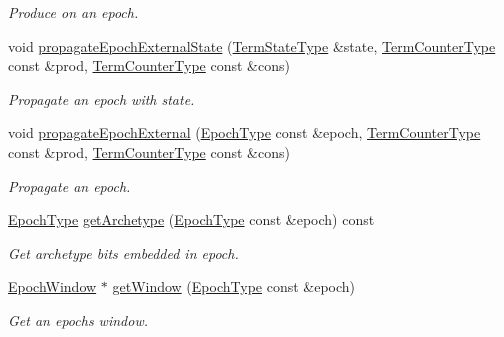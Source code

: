\begin{DoxyCompactItemize}
\begin{DoxyCompactList}\small\item\em Produce on an epoch. \end{DoxyCompactList}\item 
void \hyperlink{structvt_1_1term_1_1_termination_detector_a233dc0ec4468f6e8006c959d613c28fd}{propagate\+Epoch\+External\+State} (\hyperlink{structvt_1_1term_1_1_term_action_ae4c635b69751d887666814700ed64d65}{Term\+State\+Type} \&state, \hyperlink{namespacevt_1_1term_a4fd378cdb0c36683afc1b3399d685f7f}{Term\+Counter\+Type} const \&prod, \hyperlink{namespacevt_1_1term_a4fd378cdb0c36683afc1b3399d685f7f}{Term\+Counter\+Type} const \&cons)
\begin{DoxyCompactList}\small\item\em Propagate an epoch with state. \end{DoxyCompactList}\item 
void \hyperlink{structvt_1_1term_1_1_termination_detector_a580b7ba3727a7358125cf217e9dcab19}{propagate\+Epoch\+External} (\hyperlink{namespacevt_a985a5adf291c34a3ca263b3378388236}{Epoch\+Type} const \&epoch, \hyperlink{namespacevt_1_1term_a4fd378cdb0c36683afc1b3399d685f7f}{Term\+Counter\+Type} const \&prod, \hyperlink{namespacevt_1_1term_a4fd378cdb0c36683afc1b3399d685f7f}{Term\+Counter\+Type} const \&cons)
\begin{DoxyCompactList}\small\item\em Propagate an epoch. \end{DoxyCompactList}\item 
\hyperlink{namespacevt_a985a5adf291c34a3ca263b3378388236}{Epoch\+Type} \hyperlink{structvt_1_1term_1_1_termination_detector_ad812a021139b95077ff0168611401334}{get\+Archetype} (\hyperlink{namespacevt_a985a5adf291c34a3ca263b3378388236}{Epoch\+Type} const \&epoch) const
\begin{DoxyCompactList}\small\item\em Get archetype bits embedded in epoch. \end{DoxyCompactList}\item 
\hyperlink{structvt_1_1term_1_1_epoch_window}{Epoch\+Window} $\ast$ \hyperlink{structvt_1_1term_1_1_termination_detector_a9fb190f8db25f2296025de31dc7df72c}{get\+Window} (\hyperlink{namespacevt_a985a5adf291c34a3ca263b3378388236}{Epoch\+Type} const \&epoch)
\begin{DoxyCompactList}\small\item\em Get an epoch\textquotesingle{}s window. \end{DoxyCompactList}\item 

\end{DoxyCompactItemize}

